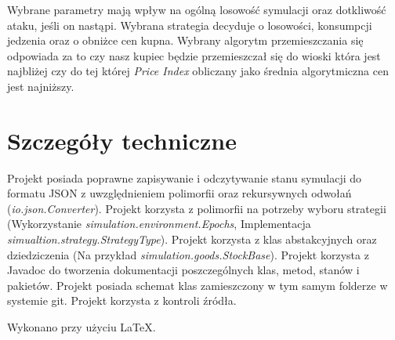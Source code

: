 \documentclass[a4paper,12pt]{article}
\begin{document}
  Wybrane parametry mają wpływ na ogólną losowość symulacji oraz dotkliwość ataku, jeśli on nastąpi.
  Wybrana strategia decyduje o losowości, konsumpcji jedzenia oraz o obniżce cen kupna.
  Wybrany algorytm przemieszczania się odpowiada za to czy nasz kupiec będzie przemieszczał się do wioski która jest najbliżej czy do tej której \textit{Price Index} obliczany jako średnia algorytmiczna cen jest najniższy.

  \section{Szczegóły techniczne}

  Projekt posiada poprawne zapisywanie i odczytywanie stanu symulacji do formatu JSON z uwzględnieniem polimorfii oraz rekursywnych odwołań (\textit{io.json.Converter}).
  Projekt korzysta z polimorfii na potrzeby wyboru strategii (Wykorzystanie \textit{simulation.environment.Epochs}, Implementacja \textit{simualtion.strategy.StrategyType}).
  Projekt korzysta z klas abstakcyjnych oraz dziedziczenia (Na przykład \textit{simulation.goods.StockBase}).
  Projekt korzysta z Javadoc do tworzenia dokumentacji poszczególnych klas, metod, stanów i pakietów.
  Projekt posiada schemat klas zamieszczony w tym samym folderze w systemie git.
  Projekt korzysta z kontroli źródła.

  \newpage
  Wykonano przy użyciu \LaTeX.
\end{document}
